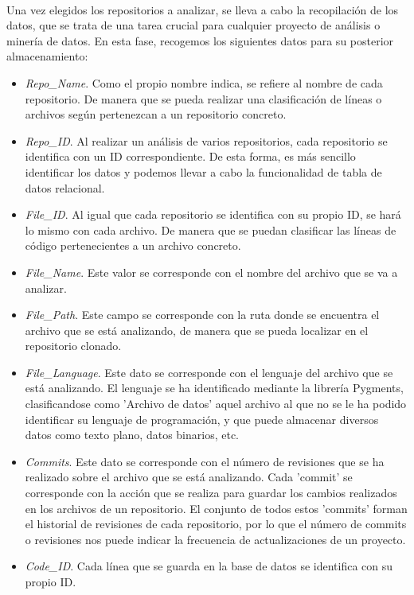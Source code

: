 \documentclass[a4paper, 12pt]{book}
\begin{document}
\\Una vez elegidos los repositorios a analizar, se lleva a cabo la recopilación de los datos, que se trata de una tarea crucial para cualquier proyecto de análisis o minería de datos. En esta fase, recogemos los siguientes datos para su posterior 
almacenamiento:

\begin{itemize}
  \item \textit{Repo\_Name}. Como el propio nombre indica, se refiere al nombre de cada repositorio. De manera que se pueda realizar una clasificación de líneas o archivos según pertenezcan a un repositorio concreto.
  \item \textit{Repo\_ID}. Al realizar un análisis de varios repositorios, cada repositorio se identifica con un ID correspondiente. De esta forma, es más sencillo identificar los datos y podemos llevar a cabo la funcionalidad
  de tabla de datos relacional.
  \item \textit{File\_ID}. Al igual que cada repositorio se identifica con su propio ID, se hará lo mismo con cada archivo. De manera que se puedan clasificar las líneas de código pertenecientes a un archivo concreto.
  \item \textit{File\_Name}. Este valor se corresponde con el nombre del archivo que se va a analizar.
  \item \textit{File\_Path}. Este campo se corresponde con la ruta donde se encuentra el archivo que se está analizando, de manera que se pueda localizar en el repositorio clonado.
  \item \textit{File\_Language}. Este dato se corresponde con el lenguaje del archivo que se está analizando. El lenguaje se ha identificado mediante la librería {Pygments}, clasificandose como 'Archivo de datos' aquel
  archivo al que no se le ha podido identificar su lenguaje de programación, y que puede almacenar diversos datos como texto plano, datos binarios, etc. 
  \item \textit{Commits}. Este dato se corresponde con el número de revisiones que se ha realizado sobre el archivo que se está analizando. Cada 'commit' se corresponde con la acción que se realiza para guardar los cambios realizados en los archivos de 
  un repositorio. El conjunto de todos estos 'commits' forman el historial de revisiones de cada repositorio, por lo que el número de commits o revisiones nos puede indicar la frecuencia de actualizaciones de un proyecto.
  \item \textit{Code\_ID}. Cada línea que se guarda en la base de datos se identifica con su propio ID.

\end{itemize}
\end{document}
